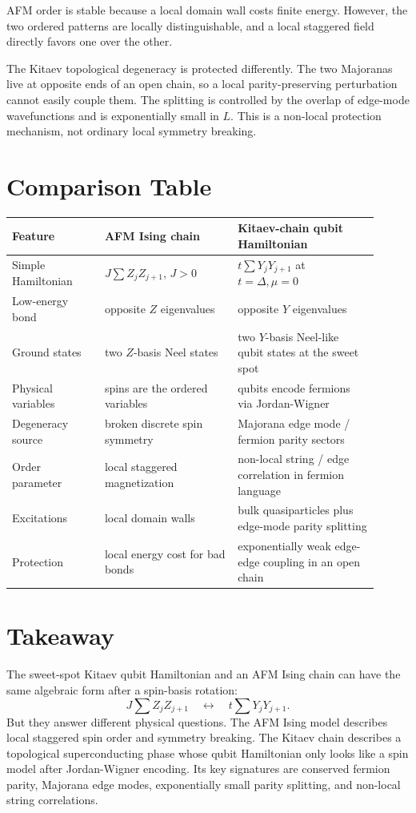 \documentclass[11pt]{article}
\begin{document}
AFM order is stable because a local domain wall costs finite energy. However,
the two ordered patterns are locally distinguishable, and a local staggered
field directly favors one over the other.

The Kitaev topological degeneracy is protected differently. The two Majoranas
live at opposite ends of an open chain, so a local parity-preserving
perturbation cannot easily couple them. The splitting is controlled by the
overlap of edge-mode wavefunctions and is exponentially small in $L$. This is a
non-local protection mechanism, not ordinary local symmetry breaking.

\section{Comparison Table}

\begin{center}
\small
\begin{tabular}{p{0.23\linewidth}p{0.33\linewidth}p{0.35\linewidth}}
\toprule
Feature & AFM Ising chain & Kitaev-chain qubit Hamiltonian \\
\midrule
Simple Hamiltonian
& $J\sum Z_jZ_{j+1}$, $J>0$
& $t\sum Y_jY_{j+1}$ at $t=\Delta,\mu=0$ \\[3pt]
Low-energy bond
& opposite $Z$ eigenvalues
& opposite $Y$ eigenvalues \\[3pt]
Ground states
& two $Z$-basis Neel states
& two $Y$-basis Neel-like qubit states at the sweet spot \\[3pt]
Physical variables
& spins are the ordered variables
& qubits encode fermions via Jordan-Wigner \\[3pt]
Degeneracy source
& broken discrete spin symmetry
& Majorana edge mode / fermion parity sectors \\[3pt]
Order parameter
& local staggered magnetization
& non-local string / edge correlation in fermion language \\[3pt]
Excitations
& local domain walls
& bulk quasiparticles plus edge-mode parity splitting \\[3pt]
Protection
& local energy cost for bad bonds
& exponentially weak edge-edge coupling in an open chain \\
\bottomrule
\end{tabular}
\end{center}

\section{Takeaway}

The sweet-spot Kitaev qubit Hamiltonian and an AFM Ising chain can have the
same algebraic form after a spin-basis rotation:
\begin{equation}
  J\sum Z_jZ_{j+1}
  \quad \leftrightarrow \quad
  t\sum Y_jY_{j+1}.
\end{equation}
But they answer different physical questions. The AFM Ising model describes
local staggered spin order and symmetry breaking. The Kitaev chain describes a
topological superconducting phase whose qubit Hamiltonian only looks like a
spin model after Jordan-Wigner encoding. Its key signatures are conserved
fermion parity, Majorana edge modes, exponentially small parity splitting, and
non-local string correlations.
\end{document}
